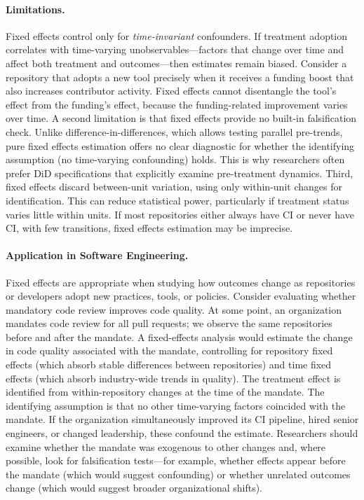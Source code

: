 \paragraph{Limitations.}
Fixed effects control only for \emph{time-invariant} confounders.
If treatment adoption correlates with time-varying unobservables---factors that change over time and affect both treatment and outcomes---then estimates remain biased.
Consider a repository that adopts a new tool precisely when it receives a funding boost that also increases contributor activity.
Fixed effects cannot disentangle the tool's effect from the funding's effect, because the funding-related improvement varies over time.
A second limitation is that fixed effects provide no built-in falsification check.
Unlike difference-in-differences, which allows testing parallel pre-trends, pure fixed effects estimation offers no clear diagnostic for whether the identifying assumption (no time-varying confounding) holds.
This is why researchers often prefer DiD specifications that explicitly examine pre-treatment dynamics.
Third, fixed effects discard between-unit variation, using only within-unit changes for identification.
This can reduce statistical power, particularly if treatment status varies little within units.
If most repositories either always have CI or never have CI, with few transitions, fixed effects estimation may be imprecise.

\paragraph{Application in Software Engineering.}
Fixed effects are appropriate when studying how outcomes change as repositories or developers adopt new practices, tools, or policies.
Consider evaluating whether mandatory code review improves code quality.
At some point, an organization mandates code review for all pull requests; we observe the same repositories before and after the mandate.
A fixed-effects analysis would estimate the change in code quality associated with the mandate, controlling for repository fixed effects (which absorb stable differences between repositories) and time fixed effects (which absorb industry-wide trends in quality).
The treatment effect is identified from within-repository changes at the time of the mandate.
The identifying assumption is that no other time-varying factors coincided with the mandate.
If the organization simultaneously improved its CI pipeline, hired senior engineers, or changed leadership, these confound the estimate.
Researchers should examine whether the mandate was exogenous to other changes and, where possible, look for falsification tests---for example, whether effects appear before the mandate (which would suggest confounding) or whether unrelated outcomes change (which would suggest broader organizational shifts).


